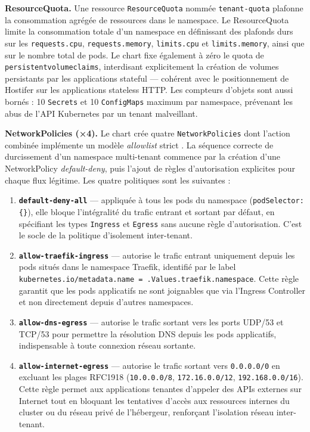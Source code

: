 \textbf{ResourceQuota.} Une ressource \texttt{ResourceQuota} nommée \texttt{tenant-quota} plafonne la consommation agrégée de ressources dans le namespace. Le ResourceQuota limite la consommation totale d'un namespace en définissant des plafonds durs sur les \texttt{requests.cpu}, \texttt{requests.memory}, \texttt{limits.cpu} et \texttt{limits.memory}, ainsi que sur le nombre total de pods.  Le chart fixe également à zéro le quota de \texttt{persistentvolumeclaims}, interdisant explicitement la création de volumes persistants par les applications stateful — cohérent avec le positionnement de Hostifer sur les applications stateless HTTP. Les compteurs d'objets sont aussi bornés : 10 \texttt{Secrets} et 10 \texttt{ConfigMaps} maximum par namespace, prévenant les abus de l'API Kubernetes par un tenant malveillant.

\textbf{NetworkPolicies (×4).} Le chart crée quatre \texttt{NetworkPolicies} dont l'action combinée implémente un modèle \textit{allowlist} strict \cite{k8s-network-policy}. La séquence correcte de durcissement d'un namespace multi-tenant commence par la création d'une NetworkPolicy \textit{default-deny}, puis l'ajout de règles d'autorisation explicites pour chaque flux légitime.  Les quatre politiques sont les suivantes :

\begin{enumerate}
  \item \textbf{\texttt{default-deny-all}} — appliquée à tous les pods du namespace (\texttt{podSelector: \{\}}), elle bloque l'intégralité du trafic entrant et sortant par défaut, en spécifiant les types \texttt{Ingress} et \texttt{Egress} sans aucune règle d'autorisation. C'est le socle de la politique d'isolement inter-tenant.
  \item \textbf{\texttt{allow-traefik-ingress}} — autorise le trafic entrant uniquement depuis les pods situés dans le namespace Traefik, identifié par le label \texttt{kubernetes.io/metadata.name = .Values.traefik.namespace}. Cette règle garantit que les pods applicatifs ne sont joignables que via l'Ingress Controller et non directement depuis d'autres namespaces.
  \item \textbf{\texttt{allow-dns-egress}} — autorise le trafic sortant vers les ports UDP/53 et TCP/53 pour permettre la résolution DNS depuis les pods applicatifs, indispensable à toute connexion réseau sortante.
  \item \textbf{\texttt{allow-internet-egress}} — autorise le trafic sortant vers \texttt{0.0.0.0/0} en excluant les plages RFC1918 (\texttt{10.0.0.0/8}, \texttt{172.16.0.0/12}, \texttt{192.168.0.0/16}). Cette règle permet aux applications tenantes d'appeler des APIs externes sur Internet tout en bloquant les tentatives d'accès aux ressources internes du cluster ou du réseau privé de l'hébergeur, renforçant l'isolation réseau inter-tenant.
\end{enumerate}

